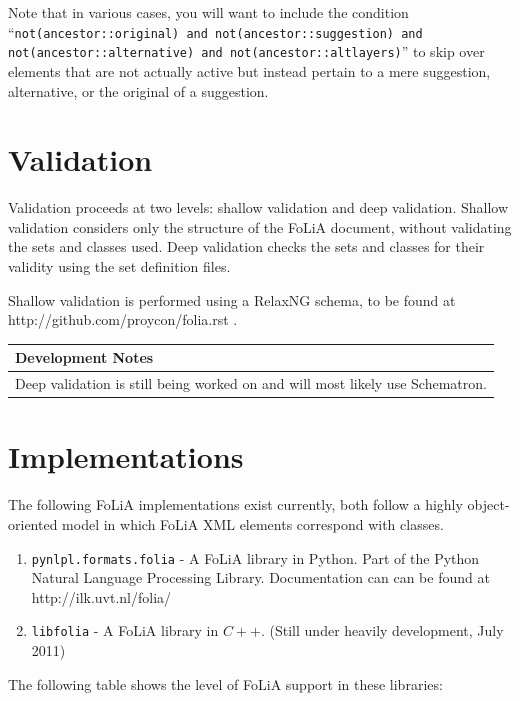\documentclass[a4paper,12pt]{report}
\newenvironment{devnotes}
{
\begin{center}
    \begin{tabular}[h!]{|p{0.8\textwidth}|}
    \hline
    {\bf Development Notes}\\\hline}
{   \\\hline
    \end{tabular}
\end{center}}
\begin{document}
Note that in various cases, you will want to include the condition ``\texttt{not(ancestor::original) and not(ancestor::suggestion) and not(ancestor::alternative) and not(ancestor::altlayers)}'' to skip over elements that are not actually active but instead pertain to a mere suggestion, alternative, or the original of a suggestion.

\chapter{Validation}

Validation proceeds at two levels: shallow validation and deep validation. Shallow validation considers only the structure of the FoLiA document, without validating the sets and classes used. Deep validation checks the sets and classes for their validity using the set definition files.

Shallow validation is performed using a RelaxNG schema, to be found at http://github.com/proycon/folia.rst .

\begin{devnotes}
Deep validation is still being worked on and will most likely use Schematron.
\end{devnotes}

\chapter{Implementations}

The following FoLiA implementations exist currently, both follow a highly object-oriented model in which FoLiA XML elements correspond with classes.

\begin{enumerate}
\item \texttt{pynlpl.formats.folia} - A FoLiA library in Python. Part of the Python Natural Language Processing Library. Documentation can can be found at http://ilk.uvt.nl/folia/
\item \texttt{libfolia} - A FoLiA library in $C++$. (Still under heavily development, July 2011)
\end{enumerate}

The following table shows the level of FoLiA support in these libraries:
\end{document}
